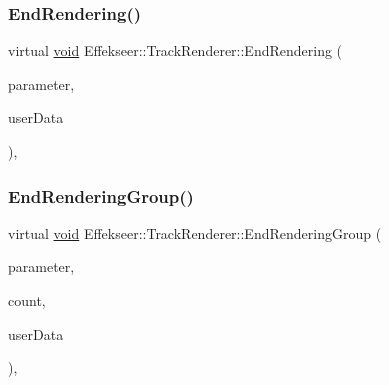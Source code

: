 \subsubsection{\texorpdfstring{End\+Rendering()}{EndRendering()}}
{\footnotesize\ttfamily virtual \mbox{\hyperlink{namespace_effekseer_ab34c4088e512200cf4c2716f168deb56}{void}} Effekseer\+::\+Track\+Renderer\+::\+End\+Rendering (\begin{DoxyParamCaption}\item[{const \mbox{\hyperlink{struct_effekseer_1_1_track_renderer_1_1_node_parameter}{Node\+Parameter}} \&}]{parameter,  }\item[{\mbox{\hyperlink{namespace_effekseer_ab34c4088e512200cf4c2716f168deb56}{void}} $\ast$}]{user\+Data }\end{DoxyParamCaption})\hspace{0.3cm}{\ttfamily [inline]}, {\ttfamily [virtual]}}

\mbox{\label{class_effekseer_1_1_track_renderer_a3f64ad809595ff880d3575ed8345ef0a}} 
\subsubsection{\texorpdfstring{End\+Rendering\+Group()}{EndRenderingGroup()}}
{\footnotesize\ttfamily virtual \mbox{\hyperlink{namespace_effekseer_ab34c4088e512200cf4c2716f168deb56}{void}} Effekseer\+::\+Track\+Renderer\+::\+End\+Rendering\+Group (\begin{DoxyParamCaption}\item[{const \mbox{\hyperlink{struct_effekseer_1_1_track_renderer_1_1_node_parameter}{Node\+Parameter}} \&}]{parameter,  }\item[{int32\+\_\+t}]{count,  }\item[{\mbox{\hyperlink{namespace_effekseer_ab34c4088e512200cf4c2716f168deb56}{void}} $\ast$}]{user\+Data }\end{DoxyParamCaption})\hspace{0.3cm}{\ttfamily [inline]}, {\ttfamily [virtual]}}

\mbox{\label{class_effekseer_1_1_track_renderer_a5d99f7a58b254166cf938bc739bbb387}} 
